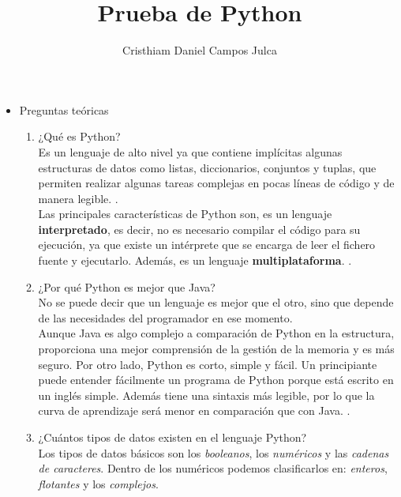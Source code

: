 \documentclass[a4paper,openright,12pt]{report}
\title{Prueba de Python}
\author{Cristhiam Daniel Campos Julca}
\begin{document}
	
	\maketitle
	
	\begin{itemize}
		\item Preguntas teóricas
		
		\begin{enumerate}
			\item ¿Qué es Python? \\
			
			Es un lenguaje de alto nivel ya que contiene implícitas algunas estructuras de datos como listas, diccionarios, conjuntos y tuplas, que permiten realizar algunas tareas complejas en pocas líneas de código y de manera legible. \cite{challenger2014lenguaje}. \\
			
			Las principales características de Python son, es un lenguaje \textbf{interpretado}, es decir, no es necesario compilar el código para su ejecución, ya que existe un intérprete que se encarga de leer el fichero fuente y ejecutarlo. Además, es un lenguaje \textbf{multiplataforma}. \cite{montoro2012python}.\\
						
			\item ¿Por qué Python es mejor que Java? \\
			
			No se puede decir que un lenguaje es mejor que el otro, sino que depende de las necesidades del programador en ese momento. \\
			
			Aunque Java es algo complejo a comparación de Python en la estructura, proporciona una mejor comprensión de la gestión de la memoria y es más seguro. Por otro lado, Python es corto, simple y fácil. Un principiante puede entender fácilmente un programa de Python porque está escrito en un inglés simple. Además tiene una sintaxis más legible, por lo que la curva de aprendizaje será menor en comparación que con Java. \cite{khoirom2020comparative}.\\
						
			\item ¿Cuántos tipos de datos existen en el lenguaje Python? \\
			
			Los tipos de datos básicos son los \textit{booleanos}, los \textit{numéricos} y las \textit{cadenas de caracteres}. Dentro de los numéricos podemos clasificarlos en: \textit{enteros}, \textit{flotantes} y los \textit{complejos}. \\
			

\end{enumerate}
\end{itemize}
\end{document}
